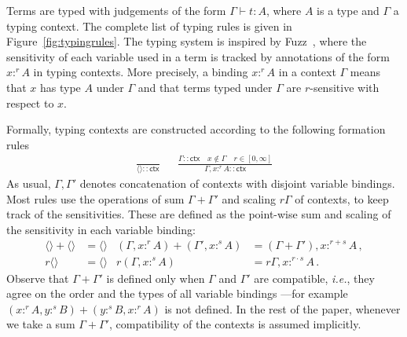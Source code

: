 \documentclass[a4paper,UKenglish,cleveref, autoref, thm-restate]{lipics-v2021}
\newcommand{\ie}{\textit{i.e.}}
\newcommand{\extpreals}{[0,\infty]}
\newcommand{\emptyctx}{\langle\rangle}
\newcommand{\scaling}{}
\newcommand{\ts}{\vdash}
\newcommand{\hastype}[3]{#1\ts #2 : #3}
\begin{document}
Terms are typed with judgements of the form $\hastype{\Gamma}{t}{A}$, where $A$ is a type and $\Gamma$ a typing context. The complete list of typing rules is given in Figure~\ref{fig:typingrules}.
The typing system is inspired by Fuzz~\cite{ReedP10}, where the sensitivity of each variable used in a term is tracked by annotations of the form $x:^r A$ in typing contexts. More precisely,
a binding $x:^rA$ in a context $\Gamma$ means that $x$ has type $A$ under $\Gamma$ and that terms typed under $\Gamma$ are $r$-sensitive with respect to
$x$.

Formally, typing contexts are constructed according to the following formation rules
\begin{align*}
    \frac{}{\emptyctx :: \textsf{ctx}}
    &&
    \frac{\Gamma :: \textsf{ctx} \quad x \notin \Gamma \quad r\in \extpreals}{ \Gamma, x :^r A :: \textsf{ctx}}
\end{align*}
As usual, $\Gamma, \Gamma'$ denotes concatenation of contexts with disjoint variable bindings.  
Most rules use the operations of sum $\Gamma+\Gamma'$ and scaling $r\scaling \Gamma$ of contexts, to keep track of the sensitivities.
These are defined as the point-wise sum and scaling of the sensitivity in each variable binding: 
\begin{align*}
 \emptyctx + \emptyctx &= \emptyctx &
 (\Gamma, x :^r A) + (\Gamma', x :^s A) &= (\Gamma + \Gamma'), x :^{r+s} A \,,
\\
 r \scaling \emptyctx &= \emptyctx &
 r \scaling (\Gamma, x :^s A) &= r \scaling \Gamma, x :^{r \cdot s} A \,.
\end{align*}
Observe that $\Gamma+\Gamma'$ is defined only when $\Gamma$ and $\Gamma'$ are compatible, \ie, they agree on the order and the types of all variable bindings ---for example $(x:^r A,y:^s B)+(y:^s B,x:^r A)$ is not defined. In the rest of the paper, whenever we take a sum $\Gamma+\Gamma'$, compatibility of the contexts is assumed implicitly.
\end{document}
